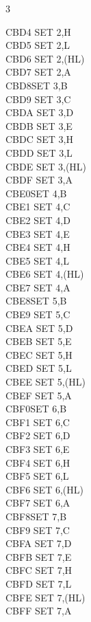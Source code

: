 \begin{multicols}{3}
{\begin{tabbing}
	CBD4\> 	SET 2,H\\
	CBD5\> 	SET 2,L\\
	CBD6\> 	SET 2,(HL)\\
	CBD7\> 	SET 2,A\\
	CBD8\>SET 3,B\\
	CBD9\> 	SET 3,C\\
	CBDA\> 	SET 3,D\\
	CBDB\> 	SET 3,E\\
	CBDC\> 	SET 3,H\\
	CBDD\> 	SET 3,L\\
	CBDE\> 	SET 3,(HL)\\
	CBDF\> 	SET 3,A\\
	CBE0\>SET 4,B\\
	CBE1\> 	SET 4,C\\
	CBE2\> 	SET 4,D\\
	CBE3\> 	SET 4,E\\
	CBE4\> 	SET 4,H\\
	CBE5\> 	SET 4,L\\
	CBE6\> 	SET 4,(HL)\\
	CBE7\> 	SET 4,A\\
	CBE8\>SET 5,B\\
	CBE9\> 	SET 5,C\\
	CBEA\> 	SET 5,D\\
	CBEB\> 	SET 5,E\\
	CBEC\> 	SET 5,H\\
	CBED\> 	SET 5,L\\
	CBEE\> 	SET 5,(HL)\\
	CBEF\> 	SET 5,A\\
	CBF0\>SET 6,B\\
	CBF1\> 	SET 6,C\\
	CBF2\> 	SET 6,D\\
	CBF3\> 	SET 6,E\\
	CBF4\> 	SET 6,H\\
	CBF5\> 	SET 6,L\\
	CBF6\> 	SET 6,(HL)\\
	CBF7\> 	SET 6,A\\
	CBF8\>SET 7,B\\
	CBF9\> 	SET 7,C\\
	CBFA\> 	SET 7,D\\
	CBFB\> 	SET 7,E\\
	CBFC\> 	SET 7,H\\
	CBFD\> 	SET 7,L\\
	CBFE\> 	SET 7,(HL)\\
	CBFF\> 	SET 7,A\\

\end{tabbing}}
\end{multicols}
